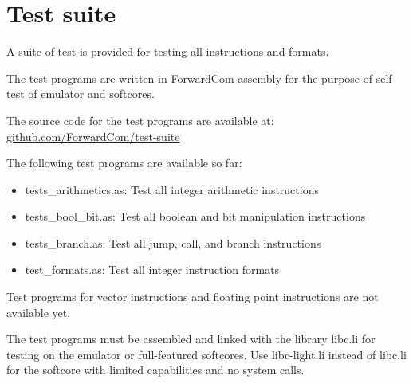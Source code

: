 \documentclass[forwardcom.tex]{subfiles}
\begin{document}
\RaggedRight

\chapter{Test suite}
A suite of test is provided for testing all instructions and formats. 
\vv

The test programs are written in ForwardCom assembly for the purpose of self test of emulator and softcores.
\vv

The source code for the test programs are available at:\\
\href{https://github.com/ForwardCom/test-suite}{github.com/ForwardCom/test-suite}
\vv

The following test programs are available so far:
\begin{itemize}
\item tests\_arithmetics.as: Test all integer arithmetic instructions
\item tests\_bool\_bit.as: Test all boolean and bit manipulation instructions
\item tests\_branch.as: Test all jump, call, and branch instructions
\item test\_formats.as: Test all integer instruction formats
\end{itemize}
\vv

Test programs for vector instructions and floating point instructions are not available yet.
\vv

The test programs must be assembled and linked with the library libc.li for testing on the emulator or full-featured softcores. Use libc-light.li instead of libc.li for the softcore with limited capabilities and no system calls.
\vv
\end{document}
